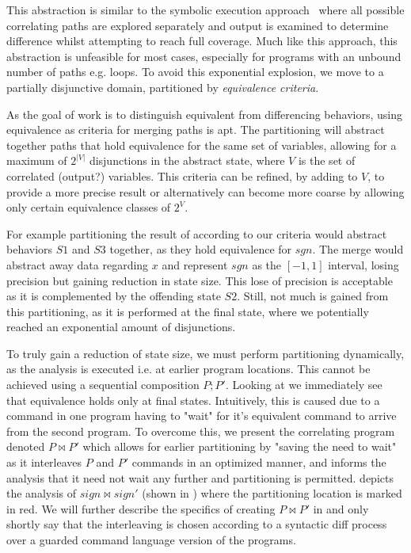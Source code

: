 This abstraction is similar to the symbolic execution approach~\cite{} where all possible correlating paths are explored separately and output is examined to determine difference whilst attempting to reach full coverage. Much like this approach, this abstraction is unfeasible for most cases, especially for programs with an unbound number of paths e.g. loops. To avoid this exponential explosion, we move to a partially disjunctive domain, partitioned by \emph{equivalence criteria}.

As the goal of work is to distinguish equivalent from differencing behaviors, using equivalence as criteria for merging paths is apt. The partitioning will abstract together paths that hold equivalence for the same set of variables, allowing for a maximum of $2^{|V|}$ disjunctions in the abstract state, where $V$ is the set of correlated (output?) variables. This criteria can be refined, by adding to $V$, to provide a more precise result or alternatively can become more coarse by allowing only certain equivalence classes of $2^{V}$.

For example partitioning the result of  according to our criteria would abstract behaviors $S1$ and $S3$ together, as they hold equivalence for $sgn$. The merge would abstract away data regarding $x$ and represent $sgn$ as the $[-1,1]$ interval, losing precision but gaining reduction in state size. This lose of precision is acceptable as it is complemented by the offending state $S2$. Still, not much is gained from this partitioning, as it is performed at the final state, where we potentially reached an exponential amount of disjunctions. 

To truly gain a reduction of state size, we must perform partitioning dynamically, as the analysis is executed i.e. at earlier program locations. This cannot be achieved using a sequential composition $P;P'$. Looking at  we immediately see that equivalence holds only at final states. Intuitively, this is caused due to a command in one program having to "wait" for it's equivalent command to arrive from the second program. To overcome this, we present the correlating program denoted $P \bowtie P'$ which allows for earlier partitioning by "saving the need to wait" as it interleaves $P$ and $P'$ commands in an optimized manner, and informs the analysis that it need not wait any further and partitioning is permitted.  depicts the analysis of $sign \bowtie sign'$ (shown in ) where the partitioning location is marked in red. We will further describe the specifics of creating $P \bowtie P'$ in  and only shortly say that the interleaving is chosen according to a syntactic diff process over a guarded command language version of the programs.





